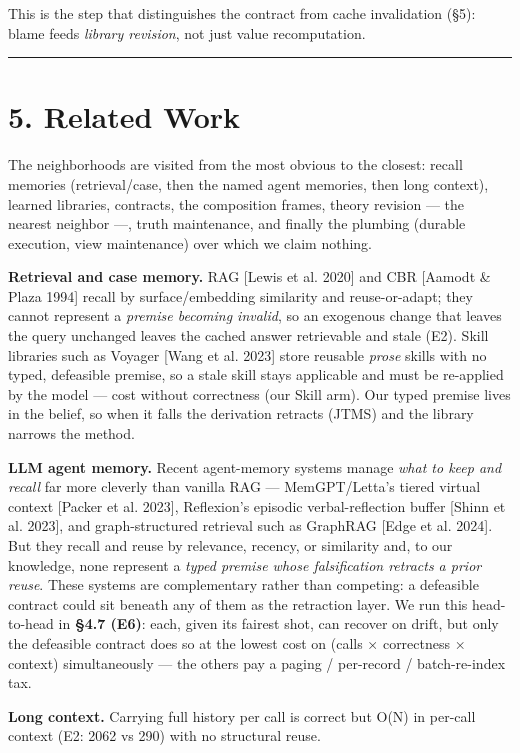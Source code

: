\documentclass[11pt]{article}
\begin{document}
This is the step that distinguishes the contract from cache invalidation (§5): blame feeds \emph{library revision}, not just value recomputation.

\medskip\hrule\medskip

\section*{5. Related Work}

The neighborhoods are visited from the most obvious to the closest: recall memories (retrieval/case, then the named agent memories, then long context), learned libraries, contracts, the composition frames, theory revision — the nearest neighbor —, truth maintenance, and finally the plumbing (durable execution, view maintenance) over which we claim nothing.

\textbf{Retrieval and case memory.} RAG [Lewis et al. 2020] and CBR [Aamodt \& Plaza 1994] recall by surface/embedding similarity and reuse-or-adapt; they cannot represent a \emph{premise becoming invalid}, so an exogenous change that leaves the query unchanged leaves the cached answer retrievable and stale (E2). Skill libraries such as Voyager [Wang et al. 2023] store reusable \emph{prose} skills with no typed, defeasible premise, so a stale skill stays applicable and must be re-applied by the model — cost without correctness (our Skill arm). Our typed premise lives in the belief, so when it falls the derivation retracts (JTMS) and the library narrows the method.

\textbf{LLM agent memory.} Recent agent-memory systems manage \emph{what to keep and recall} far more cleverly than vanilla RAG — MemGPT/Letta's tiered virtual context [Packer et al. 2023], Reflexion's episodic verbal-reflection buffer [Shinn et al. 2023], and graph-structured retrieval such as GraphRAG [Edge et al. 2024]. But they recall and reuse by relevance, recency, or similarity and, to our knowledge, none represent a \emph{typed premise whose falsification retracts a prior reuse}. These systems are complementary rather than competing: a defeasible contract could sit beneath any of them as the retraction layer. We run this head-to-head in \textbf{§4.7 (E6)}: each, given its fairest shot, can recover on drift, but only the defeasible contract does so at the lowest cost on (calls × correctness × context) simultaneously — the others pay a paging / per-record / batch-re-index tax.

\textbf{Long context.} Carrying full history per call is correct but O(N) in per-call context (E2: 2062 vs 290) with no structural reuse.
\end{document}
